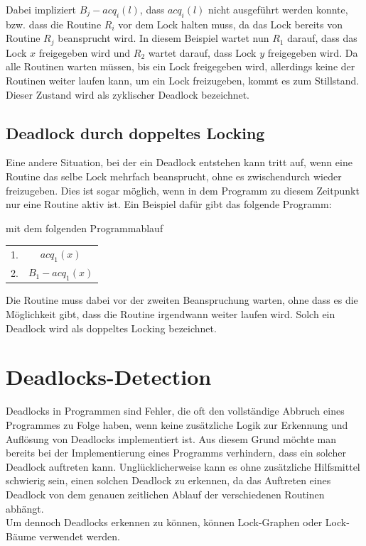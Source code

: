 Dabei impliziert $B_j-acq_i(l)$, dass $acq_{i}(l)$ nicht ausgeführt werden konnte,
bzw. dass die Routine $R_i$ vor dem Lock halten muss, da das Lock bereits von 
Routine $R_j$ beansprucht wird. In diesem Beispiel wartet nun $R_1$ 
darauf, dass das Lock $x$ freigegeben wird und $R_2$ wartet darauf, dass Lock 
$y$ freigegeben wird. Da alle Routinen warten müssen, bis ein Lock freigegeben 
wird, allerdings keine der Routinen weiter laufen kann, um ein Lock freizugeben, 
kommt es zum Stillstand. Dieser Zustand wird als zyklischer Deadlock bezeichnet.
\subsection{Deadlock durch doppeltes Locking}\label{Kap::Theo:DoubleLocking}
Eine andere Situation, bei der ein Deadlock entstehen kann tritt auf, wenn 
eine Routine das selbe Lock mehrfach beansprucht, ohne es zwischendurch wieder 
freizugeben. Dies ist sogar möglich, wenn in dem Programm zu diesem Zeitpunkt
nur eine Routine aktiv ist. Ein Beispiel dafür gibt das folgende Programm:
\begin{figure}[H]
    
\end{figure}
mit dem folgenden Programmablauf
\begin{table}[H]
    \centering
    \begin{tabular}{cc}
        1. & $acq_{1}(x)$ \\
        2. & $B_1-acq_1(x)$
    \end{tabular}
\end{table}
Die Routine muss dabei vor der zweiten Beanspruchung warten,
ohne dass es die Möglichkeit gibt, dass die Routine irgendwann weiter laufen wird.
Solch ein Deadlock wird als doppeltes Locking bezeichnet.\\
\section{Deadlocks-Detection}
Deadlocks in Programmen sind Fehler, die oft den vollständige Abbruch eines 
Programmes zu Folge haben, wenn keine zusätzliche Logik zur Erkennung und Auflösung von 
Deadlocks implementiert ist. Aus diesem Grund möchte man bereits bei der 
Implementierung eines Programms verhindern, dass ein solcher Deadlock auftreten 
kann. Unglücklicherweise kann es ohne zusätzliche Hilfsmittel schwierig sein, 
einen solchen Deadlock zu erkennen, da das Auftreten eines Deadlock von dem 
genauen zeitlichen Ablauf der verschiedenen Routinen abhängt.\\
Um dennoch Deadlocks 
erkennen zu können, können Lock-Graphen oder Lock-Bäume verwendet werden.
